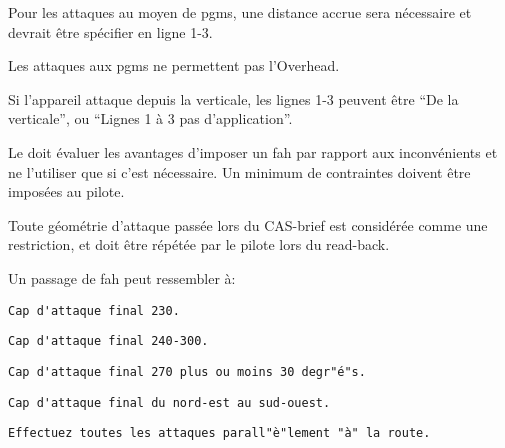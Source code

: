 \begin{e1}
\begin{e2}
\begin{e3}
		\end{e3}		
		
		\begin{e2}
			\item Pour les attaques au moyen de \glspl{pgm}, une distance accrue sera nécessaire et devrait être spécifier en ligne 1-3.
		
			Les attaques aux \glspl{pgm} ne permettent pas l'Overhead.
		
			\item Si l'appareil attaque depuis la verticale, les lignes 1-3 peuvent être ``De la verticale'', ou ``Lignes 1 à 3 pas d'application''.
		\end{e2}
		
		\begin{minipage}{\linewidth}
			 {}
		\end{minipage}
		
		
		\begin{minipage}{\linewidth}
			 {}
		\end{minipage}
		
		\begin{e3}
			\item Le \ja{} doit évaluer les avantages d'imposer un \gls{fah} par rapport aux inconvénients et ne l'utiliser que si c'est nécessaire. Un minimum de contraintes doivent être imposées au pilote.
			
			\item Toute géométrie d'attaque passée lors du CAS-brief est considérée comme une restriction, et doit être répétée par le pilote lors du read-back.
			\begin{minipage}{\linewidth}
			\item Un passage de \gls{fah} peut ressembler à:
			\begin{lstlisting}[caption=FAH: cap magnétique, label=fah1]
			Cap d'attaque final 230.
			\end{lstlisting}
			\begin{lstlisting}[caption=FAH: cap magnétique avec cône, label=fah2]
			Cap d'attaque final 240-300.
			\end{lstlisting}
			\begin{lstlisting}[caption=FAH: cap magnétique avec une fourchette, label=fah3]
			Cap d'attaque final 270 plus ou moins 30 degr"é"s.
			\end{lstlisting}
			\begin{lstlisting}[caption=FAH: direction cardinale, label=fah4]
			Cap d'attaque final du nord-est au sud-ouest.
			\end{lstlisting}
			\begin{lstlisting}[caption=FAH: référence géographique, label=fah5]
			Effectuez toutes les attaques parall"è"lement "à" la route.
			\end{lstlisting}
			\end{minipage}
		\end{e3}
		

\end{e2}
\end{e1}
